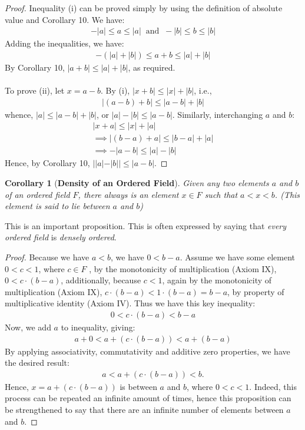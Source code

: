 \documentclass[12pt]{book}
\newtheorem{corollary}{Corollary}
\theoremstyle{definition}
\begin{document}
\begin{proof}
	Inequality (i) can be proved simply by using the definition of absolute value and Corollary 10. We have:
	\begin{align*}
	-|a| \leq a\leq |a|	\;\;\text{and}\;\; -|b|\leq b \leq |b|
	\end{align*}
 Adding the inequalities, we have:
\begin{align*}
-(|a|+|b|) \leq a+b \leq |a|+|b|	
\end{align*}
 By Corollary 10, $|a+b|\leq |a|+|b|$, as required.\\
 \\
 \indent
 To prove (ii), let $x =a-b$. By (i), $|x+b| \leq |x|+|b|$, i.e., 
 \begin{align*}
 |(a-b) +b| \leq |a-b| +|b|	
 \end{align*}
whence, $|a|\leq |a-b|+|b|$, or $|a|-|b| \leq |a-b|$. Similarly, interchanging $a$ and $b$:
\begin{align*}
	|x+a|\leq |x|+|a|\\
	\implies |(b-a)+a| \leq |b-a|+|a|\\
	\implies -|a-b| \leq |a| -|b|
\end{align*}
Hence, by Corollary 10, $||a|-|b||\leq |a-b|.$  
\end{proof}

\begin{corollary}[\textbf{Density of an Ordered Field}]
	Given any two elements $a$ and $b$ of an ordered field $F$, there always is an element $x \in F$ such that $a<x<b$. (This element is said to lie between $a$ and $b$)
\end{corollary}
This is an important proposition. This is often expressed by saying that \textit{every ordered field} is \textit{densely ordered}.
\begin{proof}
	Because we have $a<b$, we have $0<b-a$. Assume we have some element $0<c<1$, where $c \in F$ , by the monotonicity of multiplication (Axiom IX), $0<c\cdot (b-a)$, additionally, because $c<1$, again by the monotonicity of multiplication (Axiom IX), $c\cdot (b-a)< 1\cdot (b-a)=b-a$, by property of multiplicative identity (Axiom IV). Thus we have this key inequality:
	\begin{align*}
		0 <c\cdot (b-a) < b-a
	\end{align*}
Now, we add $a$ to inequality, giving:
\begin{align*}
a+0< a+(c\cdot (b-a)) < a+(b-a)
\end{align*}
By applying associativity, commutativity and additive zero properties, we have the desired result:
\begin{align*}
a<a+(c\cdot (b-a)) < b.
\end{align*}
Hence, $x= a+(c\cdot (b-a))$ is between $a$ and $b$, where $0<c<1$. Indeed, this process can be repeated an infinite amount of times, hence this proposition can be strengthened to say that there are an infinite number of elements between $a$ and $b$. 

\end{proof}
\end{document}
